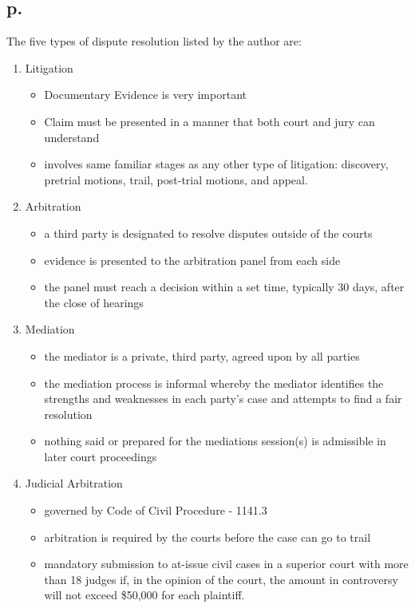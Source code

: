 \documentclass[12pt]{article}
\renewcommand{\=}[1]{\stackrel{#1}{=}} %
\theoremstyle{definition}
\theoremstyle{remark}
\begin{document}
\subsection{p.}
The five types of dispute resolution listed by the author are:
\begin{enumerate}
	\item Litigation
	\begin{itemize}
		\item Documentary Evidence is very important
		\item Claim must be presented in a manner that both court and jury can understand
		\item involves same familiar stages as any other type of litigation: discovery, pretrial motions, trail, post-trial motions, and appeal.
	\end{itemize}
	\item Arbitration
	\begin{itemize}
		\item a third party is designated to resolve disputes outside of the courts
		\item evidence is presented to the arbitration panel from each side
		\item the panel must reach a decision within a set time, typically 30 days, after the close of hearings
	\end{itemize}
	\item Mediation
	\begin{itemize}
		\item the mediator is a private, third party, agreed upon by all parties
		\item the mediation process is informal whereby the mediator identifies the strengths and weaknesses in each party's case and attempts to find a fair resolution
		\item nothing said or prepared for the mediations session(s) is admissible in later court proceedings
	\end{itemize}
	\item Judicial Arbitration
	\begin{itemize}
		\item governed by Code of Civil Procedure  - 1141.3
		\item arbitration is required by the courts before the case can go to trail
		\item mandatory submission to at-issue civil cases in a superior court with more than 18 judges if, in the opinion of the court, the amount in controversy will not exceed \$50,000 for each plaintiff.

\end{itemize}
\end{enumerate}
\end{document}
